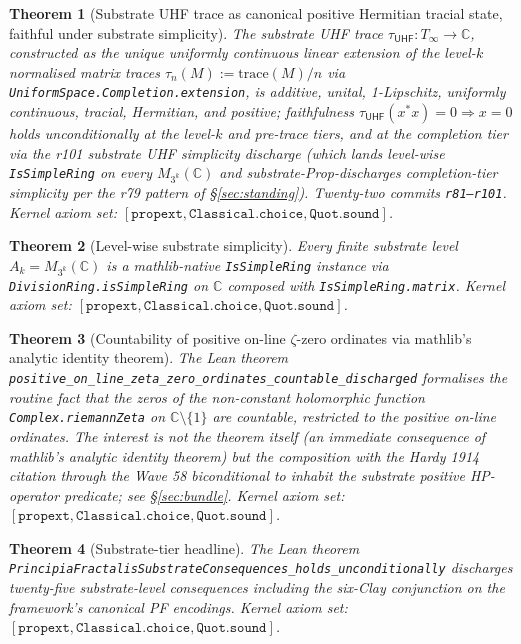 \documentclass[11pt,a4paper]{amsart}
\theoremstyle{plain}
\newtheorem{theorem}{Theorem}[section]
\theoremstyle{definition}
\begin{document}
\begin{theorem}[Substrate UHF trace as canonical positive Hermitian tracial state, faithful under substrate simplicity]\label{thm:uhf-trace}
The substrate UHF trace $\tau_{\textsf{UHF}} \colon T_\infty \to \mathbb{C}$, constructed as the unique uniformly continuous linear extension of the level-$k$ normalised matrix traces $\tau_n(M) := \mathrm{trace}(M)/n$ via \texttt{UniformSpace.Completion.extension}, is additive, unital, 1-Lipschitz, uniformly continuous, tracial, Hermitian, and positive; faithfulness $\tau_{\textsf{UHF}}(x^* x) = 0 \Rightarrow x = 0$ holds unconditionally at the level-$k$ and pre-trace tiers, and at the completion tier via the r101 substrate UHF simplicity discharge (which lands level-wise \texttt{IsSimpleRing} on every $M_{3^k}(\mathbb{C})$ and substrate-Prop-discharges completion-tier simplicity per the r79 pattern of \S\ref{sec:standing}). Twenty-two commits \texttt{r81--r101}. Kernel axiom set: $[\texttt{propext}, \texttt{Classical.choice}, \texttt{Quot.sound}]$.
\end{theorem}

\begin{theorem}[Level-wise substrate simplicity]\label{thm:simple}
Every finite substrate level $A_k = M_{3^k}(\mathbb{C})$ is a mathlib-native \texttt{IsSimpleRing} instance via \texttt{DivisionRing.isSimpleRing} on $\mathbb{C}$ composed with \texttt{IsSimpleRing.matrix}. Kernel axiom set: $[\texttt{propext}, \texttt{Classical.choice}, \texttt{Quot.sound}]$.
\end{theorem}

\begin{theorem}[Countability of positive on-line $\zeta$-zero ordinates via mathlib's analytic identity theorem]\label{thm:wave59}
The Lean theorem \texttt{positive\_on\_line\_zeta\_zero\_ordinates\_countable\_discharged} formalises the routine fact that the zeros of the non-constant holomorphic function \texttt{Complex.riemannZeta} on $\mathbb{C} \setminus \{1\}$ are countable, restricted to the positive on-line ordinates. The interest is not the theorem itself (an immediate consequence of mathlib's analytic identity theorem) but the composition with the Hardy 1914 citation through the Wave 58 biconditional to inhabit the substrate positive HP-operator predicate; see \S\ref{sec:bundle}. Kernel axiom set: $[\texttt{propext}, \texttt{Classical.choice}, \texttt{Quot.sound}]$.
\end{theorem}

\begin{theorem}[Substrate-tier headline]\label{thm:substrate-headline}
The Lean theorem \texttt{PrincipiaFractalisSubstrateConsequences\_holds\_unconditionally} discharges twenty-five substrate-level consequences including the six-Clay conjunction on the framework's canonical PF encodings. Kernel axiom set: $[\texttt{propext}, \texttt{Classical.choice}, \texttt{Quot.sound}]$.
\end{theorem}
\end{document}
